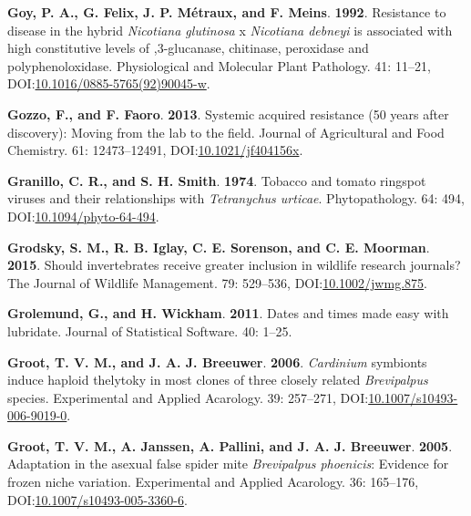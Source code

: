 \documentclass[12pt,final,CPage]{ufthesis}
\newlength{\cslhangindent}
\newenvironment{CSLReferences}[2] %
{%
	\setlength{\parindent}{0pt}
	\ifodd #1 \everypar{\setlength{\hangindent}{\cslhangindent}}\ignorespaces\fi
	\ifnum #2 > 0
	\setlength{\parskip}{#2\baselineskip}
	\fi
}%
{}
\begin{document}
{\begin{CSLReferences}{1}{0}
  \leavevmode{}%
  \textbf{Goy, P. A., G. Felix, J. P. Métraux, and F. Meins}. \textbf{1992}. Resistance to disease in the hybrid {\emph{Nicotiana glutinosa}} x {\emph{Nicotiana debneyi}} is associated with high constitutive levels of ,3-glucanase, chitinase, peroxidase and polyphenoloxidase. Physiological and Molecular Plant Pathology. 41: 11--21, DOI:\href{https://doi.org/10.1016/0885-5765(92)90045-w}{10.1016/0885-5765(92)90045-w}.

  \leavevmode{}%
  \textbf{Gozzo, F., and F. Faoro}. \textbf{2013}. Systemic acquired resistance (50 years after discovery): Moving from the lab to the field. Journal of Agricultural and Food Chemistry. 61: 12473--12491, DOI:\href{https://doi.org/10.1021/jf404156x}{10.1021/jf404156x}.

  \leavevmode{}%
  \textbf{Granillo, C. R., and S. H. Smith}. \textbf{1974}. Tobacco and tomato ringspot viruses and their relationships with {\emph{Tetranychus urticae}}. Phytopathology. 64: 494, DOI:\href{https://doi.org/10.1094/phyto-64-494}{10.1094/phyto-64-494}.

  \leavevmode{}%
  \textbf{Grodsky, S. M., R. B. Iglay, C. E. Sorenson, and C. E. Moorman}. \textbf{2015}. Should invertebrates receive greater inclusion in wildlife research journals? The Journal of Wildlife Management. 79: 529--536, DOI:\href{https://doi.org/10.1002/jwmg.875}{10.1002/jwmg.875}.

  \leavevmode{}%
  \textbf{Grolemund, G., and H. Wickham}. \textbf{2011}. Dates and times made easy with {lubridate}. Journal of Statistical Software. 40: 1--25.

  \leavevmode{}%
  \textbf{Groot, T. V. M., and J. A. J. Breeuwer}. \textbf{2006}. \emph{Cardinium} symbionts induce haploid thelytoky in most clones of three closely related {\emph{Brevipalpus}} species. Experimental and Applied Acarology. 39: 257--271, DOI:\href{https://doi.org/10.1007/s10493-006-9019-0}{10.1007/s10493-006-9019-0}.

  \leavevmode{}%
  \textbf{Groot, T. V. M., A. Janssen, A. Pallini, and J. A. J. Breeuwer}. \textbf{2005}. Adaptation in the asexual false spider mite {\emph{Brevipalpus phoenicis}}: Evidence for frozen niche variation. Experimental and Applied Acarology. 36: 165--176, DOI:\href{https://doi.org/10.1007/s10493-005-3360-6}{10.1007/s10493-005-3360-6}.


\end{CSLReferences}}
\end{document}
